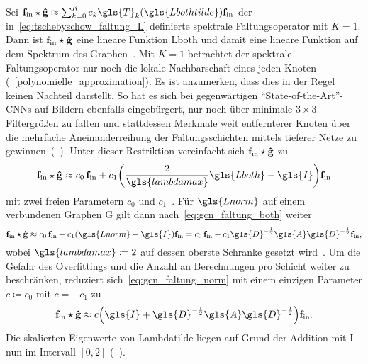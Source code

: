 Sei $\ve{f}_{\mathrm{in}} \star \ve{\hat g} \approx \sum_{k=0}^K c_k \gls{T}_k\left(\gls{Lbothtilde}\right) \ve{f}_{\mathrm{in}}$ der in~\eqref{eq:tschebyschow_faltung_L} definierte spektrale Faltungsoperator mit $K=1$.
Dann ist $\mathbf{f}_{\mathrm{in}} \star \mathbf{\hat g}$ eine lineare Funktion \bzgl{} \gls{Lboth} und damit eine lineare Funktion auf dem Spektrum des Graphen~\cite{gcn}.
Mit $K=1$ betrachtet der spektrale Faltungsoperator nur noch die lokale Nachbarschaft eines jeden Knoten (\vgl{}~\ref{polynomielle_approximation}).
Es ist anzumerken, dass dies in der Regel keinen Nachteil darstellt.
So hat es sich bei gegenwärtigen \enquote{State-of-the-Art}-\glspl{CNN} auf Bildern ebenfalls eingebürgert, nur noch über minimale $3\times3$ Filtergrößen zu falten und stattdessen Merkmale weit entfernterer Knoten über die mehrfache Aneinanderreihung der Faltungsschichten mittels tieferer Netze zu gewinnen~(\vgl{}~\cite{gcn, vgg, He}).
Unter dieser Restriktion vereinfacht sich $\mathbf{f}_{\mathrm{in}} \star \mathbf{\hat g}$ zu
\begin{equation}
  \ve{f}_{\mathrm{in}} \star \ve{\hat g} \approx c_0\, \ve{f}_{\mathrm{in}} + c_1 \left(\frac{2}{\gls{lambdamax}}\gls{Lboth} - \gls{I}\right)\ve{f}_{\mathrm{in}}
  \label{eq:gcn_faltung_both}
\end{equation}
mit zwei freien Parametern $c_0$ und $c_1$~\cite{gcn}.
Für $\gls{Lnorm}$ auf einem verbundenen Graphen \gls{G} gilt dann nach~\eqref{eq:gcn_faltung_both} weiter
\begin{equation}
  \ve{f}_{\mathrm{in}} \star \ve{\hat g} \approx c_0 \, \ve{f}_{\mathrm{in}} + c_1 \left(\gls{Lnorm} - \gls{I}\right)\ve{f}_{\mathrm{in}} = c_0 \, \ve{f}_{\mathrm{in}} - c_1 \gls{D}^{-\frac{1}{2}} \gls{A} \gls{D}^{-\frac{1}{2}} \ve{f}_{\mathrm{in}},
  \label{eq:gcn_faltung_norm}
\end{equation}
wobei $\gls{lambdamax} \coloneqq 2$ auf dessen oberste Schranke gesetzt wird~\cite{gcn}.
Um die Gefahr des Overfittings und die Anzahl an Berechnungen pro Schicht weiter zu beschränken, reduziert sich~\eqref{eq:gcn_faltung_norm} mit einem einzigen Parameter $c \coloneqq c_0$ mit $c = -c_1$ zu~\cite{gcn}
\begin{equation*}
  \ve{f}_{\mathrm{in}} \star \ve{\hat g} \approx c \left(\gls{I} + \gls{D}^{-\frac{1}{2}} \gls{A} \gls{D}^{-\frac{1}{2}} \right) \ve{f}_{\mathrm{in}}.
\end{equation*}
Die skalierten Eigenwerte von \gls{Lambdatilde} liegen auf Grund der Addition mit \gls{I} nun im Intervall $\left[0, 2\right]$ (\vgl{}~\cite{gcn}).
